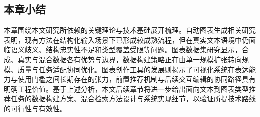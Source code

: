 \subsection{本章小结}

本章围绕本文研究所依赖的关键理论与技术基础展开梳理。自动图表生成相关研究表明，现有方法在结构化输入场景下已形成较成熟流程，但在真实文本语境中仍面临语义歧义、结构忠实性不足和类型覆盖受限等问题。图表数据集研究显示，合成、真实与混合数据各有优势与边界，数据构建策略正在由单一规模扩张转向规模、质量与任务适配协同优化。图表创作工具的发展则揭示了可视化系统在表达能力与使用门槛之间长期存在的张力，前置推荐机制与后续交互编辑的协同路径具有明确工程价值。基于上述分析，本文后续章节将进一步给出面向文本到图表类型推荐任务的数据构建方案、混合检索方法设计与系统实现细节，以验证所提技术路线的可行性与有效性。

\newpage
